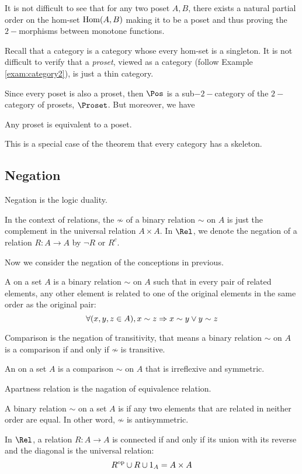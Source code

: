   It is not difficult to see that for any two poset $A,B$, there exists a natural partial order on the hom-set $\operatorname{Hom}(A,B)$ making it to be a poset and thus proving the $2-$morphisms between monotone functions.

  Recall that a  category is a category whose every hom-set is a singleton. It is not difficult to verify that a \emph{proset}, viewed as a category (follow Example \ref{exam:category2}), is just a thin category.

  Since every poset is also a proset, then $\Pos$ is a sub$-2-$category of the $2-$category of prosets, $\Proset$. But moreover, we have
  \begin{prop}
    Any proset is equivalent to a poset.
  \end{prop}
  This is a special case of the theorem that every category has a skeleton.

\subsection{Negation}
  Negation is the logic duality.

  In the context of relations, the  $\not\sim$ of a binary relation $\sim$ on $A$ is just the complement in the universal relation $A\times A$. In $\Rel$, we denote the negation of a relation $R\colon A\to A$ by $\neg R$ or $R^c$.

  Now we consider the negation of the conceptions in previous.
  \begin{defn}
    A  on a set $A$ is a binary relation $\sim$ on $A$ such that in every pair of related elements, any other     element is related to one of the original elements in the same order as the original pair:
    \begin{equation*}
      \forall(x,y,z\in A),x\sim z \Rightarrow x\sim y\vee y\sim z
    \end{equation*}
  \end{defn}
  Comparison is the negation of transitivity, that means a binary relation $\sim$ on $A$ is a comparison if and only if $\not\sim$ is transitive.

  \begin{defn}
    An  on a set $A$ is a comparison $\sim$ on $A$ that is irreflexive and symmetric.
  \end{defn}
  Apartness relation is the nagation of equivalence relation.

  \begin{defn}
    A binary relation $\sim$ on a set $A$ is  if any two elements that are related in neither order are equal. In other word, $\not\sim$ is antisymmetric.
  \end{defn}
  In $\Rel$, a relation $R\colon A\to A$ is connected if and only if its union with its reverse and the diagonal is the universal relation:
  \begin{equation*}
    R^{\operatorname{op}}\cup R\cup1_A = A\times A
  \end{equation*}

